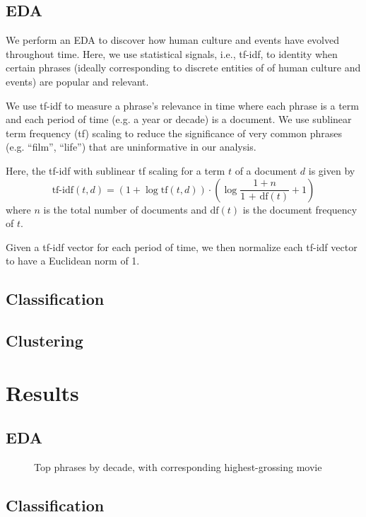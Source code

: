 \documentclass[hidelinks]{article}
\begin{document}
\begin{multicols}{2}
\subsection{EDA}
We perform an EDA to discover how human culture and events have evolved throughout time. Here, we use statistical signals, i.e., tf-idf, to identity when certain phrases (ideally corresponding to discrete entities of of human culture and events) are popular and relevant.

We use tf-idf to measure a phrase's relevance in time where each phrase is a term and each period of time (e.g. a year or decade) is a document. We use sublinear term frequency (tf) scaling to reduce the significance of very common phrases (e.g. ``film'', ``life'') that are uninformative in our analysis.

Here, the tf-idf with sublinear tf scaling for a term $t$ of a document $d$ is given by
$$\text{tf-idf}(t, d) = (1 + \log\text{tf}(t, d)) \cdot \left(\log\frac{1 + n}{\text{1 + df}(t)} + 1\right)$$
where $n$ is the total number of documents and $\text{df}(t)$ is the document frequency of $t$.

Given a tf-idf vector for each period of time, we then normalize each tf-idf vector to have a Euclidean norm of 1.
\subsection{Classification}
\subsection{Clustering}

\section{Results} %
\subsection{EDA}

\begin{figure}
\caption{Top phrases by decade, with corresponding highest-grossing movie}
\centering
{}
\label{figure:top_phrases_by_decade}
\end{figure}

\subsection{Classification}

\end{multicols}
\end{document}

